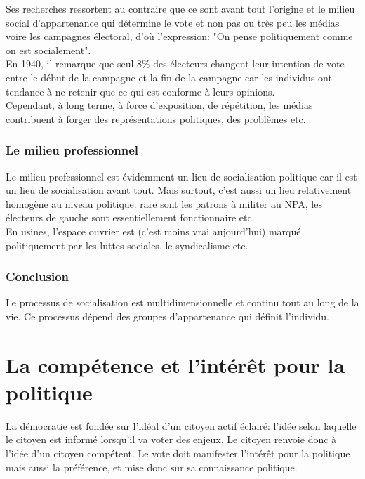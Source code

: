 \documentclass[12pt, a4paper, openany]{book}
\begin{document}
Ses recherches ressortent au contraire que ce sont avant tout l'origine et le milieu social d'appartenance qui détermine le vote et non pas ou très peu les médias voire les campagnes électoral, d'où l'expression: "On pense politiquement comme on est socialement". \\
En 1940, il remarque que seul 8\% des électeurs changent leur intention de vote entre le début de la campagne et la fin de la campagne car les individus ont tendance à ne retenir que ce qui est conforme à leurs opinions. \\
Cependant, à long terme, à force d'exposition, de répétition, les médias contribuent à forger des représentations politiques, des problèmes etc. \\


\subsubsection{Le milieu professionnel}

Le milieu professionnel est évidemment un lieu de socialisation politique car il est un lieu de socialisation avant tout. Mais surtout, c'est aussi un lieu relativement homogène au niveau politique: rare sont les patrons à militer au NPA, les électeurs de gauche sont essentiellement fonctionnaire etc. \\
En usines, l'espace ouvrier est (c'est moins vrai aujourd'hui) marqué politiquement par les luttes sociales, le syndicalisme etc. 


\subsubsection{Conclusion}

Le processus de socialisation est multidimensionnelle et continu tout au long de la vie. Ce processus dépend des groupes d'appartenance qui définit l'individu. 

\section{La compétence et l'intérêt pour la politique}

La démocratie est fondée sur l'idéal d'un citoyen actif éclairé: l'idée selon laquelle le citoyen est informé lorsqu'il va voter des enjeux. Le citoyen renvoie donc à l'idée d'un citoyen compétent. Le vote doit manifester l'intérêt pour la politique mais aussi la préférence, et mise donc sur sa connaissance politique. 
\end{document}
